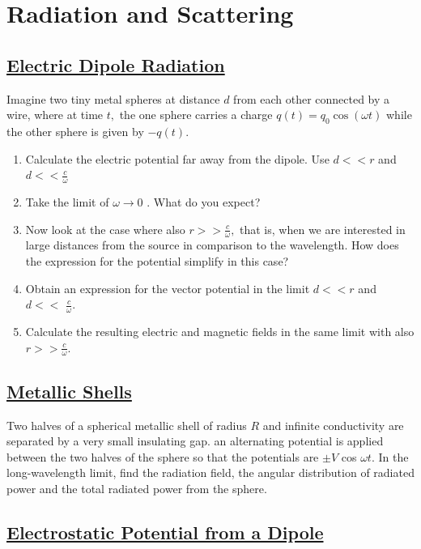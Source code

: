 \section{Radiation and Scattering}

\subsection{\hyperref[Electric Dipole Radiation]{Electric Dipole Radiation}}

Imagine two tiny metal spheres at distance $d$ from each other connected by a wire, where at time $t,$ the one sphere carries a charge $q(t)=q_{0} \cos (\omega t)$ while the other sphere is given by $-q(t)$.

\begin{enumerate}
	\item  Calculate the electric potential far away from the dipole. Use $d<<r$ and $d<<\frac{c}{\omega}$
	\item Take the limit of $\omega \rightarrow 0$ . What do you expect?
	\item Now look at the case where also $r>>\frac{c}{\omega},$ that is, when we are interested in large distances from the source in comparison to the wavelength. How does the expression for the potential simplify in this case?
	\item Obtain an expression for the vector potential in the limit $d<<r$ and $d<<$ $\frac{c}{\omega}$.
	\item Calculate the resulting electric and magnetic fields in the same limit with also $r>>\frac{c}{\omega}$.
\end{enumerate}

\subsection{\hyperref[Metallic Shells]{Metallic Shells}}
Two halves of a spherical metallic shell of radius $R$ and infinite conductivity are separated by a very small insulating gap. an alternating potential is applied between the two halves of the sphere so that the potentials are $\pm V$ cos $\omega t .$ In the long-wavelength limit, find the radiation field, the angular distribution of radiated power and the total radiated power from the sphere.

\subsection{\hyperref[Electrostatic Potential from a Dipole]{Electrostatic Potential from a Dipole}}

